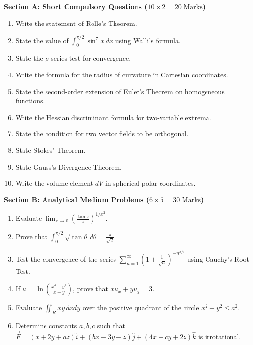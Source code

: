 \begin{mockexam}
\noindent\textbf{Section A: Short Compulsory Questions ($10 \times 2 = 20\text{ Marks}$)}
\begin{enumerate}[leftmargin=1.5em]
    \item Write the statement of Rolle's Theorem.
    \item State the value of $\int_0^{\pi/2} \sin^7 x\,dx$ using Walli's formula.
    \item State the $p$-series test for convergence.
    \item Write the formula for the radius of curvature in Cartesian coordinates.
    \item State the second-order extension of Euler's Theorem on homogeneous functions.
    \item Write the Hessian discriminant formula for two-variable extrema.
    \item State the condition for two vector fields to be orthogonal.
    \item State Stokes' Theorem.
    \item State Gauss's Divergence Theorem.
    \item Write the volume element $dV$ in spherical polar coordinates.
\end{enumerate}

\medskip
\noindent\textbf{Section B: Analytical Medium Problems ($6 \times 5 = 30\text{ Marks}$)}
\begin{enumerate}[leftmargin=1.5em, start=11]
    \item Evaluate $\lim_{x\to 0} \left(\frac{\tan x}{x}\right)^{1/x^2}$.
    \item Prove that $\int_0^{\pi/2} \sqrt{\tan\theta}\,d\theta = \frac{\pi}{\sqrt{2}}$.
    \item Test the convergence of the series $\sum_{n=1}^\infty \left(1 + \frac{1}{\sqrt{n}}\right)^{-n^{3/2}}$ using Cauchy's Root Test.
    \item If $u = \ln\left(\frac{x^4+y^4}{x+y}\right)$, prove that $x u_x + y u_y = 3$.
    \item Evaluate $\iint_R xy\,dx dy$ over the positive quadrant of the circle $x^2+y^2 \le a^2$.
    \item Determine constants $a, b, c$ such that $\vec{F} = (x+2y+az)\hat{i} + (bx-3y-z)\hat{j} + (4x+cy+2z)\hat{k}$ is irrotational.
\end{enumerate}


\end{mockexam}
